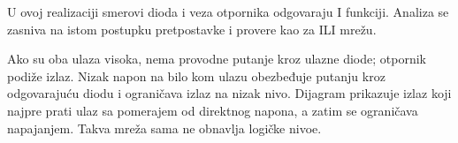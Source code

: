 U ovoj realizaciji smerovi dioda i veza otpornika odgovaraju I funkciji. Analiza se zasniva na istom postupku pretpostavke i provere kao za ILI mrežu.

Ako su oba ulaza visoka, nema provodne putanje kroz ulazne diode; otpornik podiže izlaz. Nizak napon na bilo kom ulazu obezbeđuje putanju kroz odgovarajuću diodu i ograničava izlaz na nizak nivo. Dijagram prikazuje izlaz koji najpre prati ulaz sa pomerajem od direktnog napona, a zatim se ograničava napajanjem. Takva mreža sama ne obnavlja logičke nivoe.

